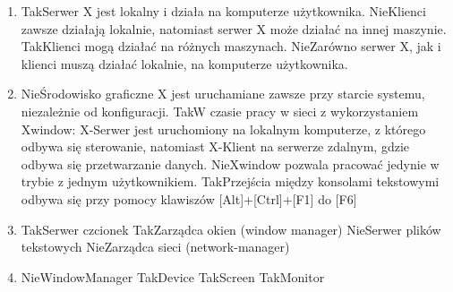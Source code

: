 \begin{enumerate}
	\item {}
	{Tak}{Serwer X jest lokalny i działa na komputerze użytkownika.}
	{Nie}{Klienci zawsze działają lokalnie, natomiast serwer X może działać na innej maszynie.}
	{Tak}{Klienci mogą działać na różnych maszynach.}
	{Nie}{Zarówno serwer X, jak i klienci muszą działać lokalnie, na komputerze użytkownika.}
	
	\item {}
	{Nie}{Środowisko graficzne X jest uruchamiane zawsze przy starcie systemu, niezależnie od konfiguracji.}
	{Tak}{W czasie pracy w sieci z wykorzystaniem Xwindow: X-Serwer jest uruchomiony na lokalnym komputerze, z którego odbywa się sterowanie, natomiast X-Klient na serwerze zdalnym, gdzie odbywa się przetwarzanie danych.}
	{Nie}{Xwindow pozwala pracować jedynie w trybie z jednym użytkownikiem.}
	{Tak}{Przejścia między konsolami tekstowymi odbywa się przy pomocy klawiszów [Alt]+[Ctrl]+[F1] do [F6]}
	
	\item {}
	{Tak}{Serwer czcionek}
	{Tak}{Zarządca okien (window manager)}
	{Nie}{Serwer plików tekstowych}
	{Nie}{Zarządca sieci (network-manager)}
	
	\item {}
	{Nie}{WindowManager}
	{Tak}{Device}
	{Tak}{Screen}
	{Tak}{Monitor}
\end{enumerate}
